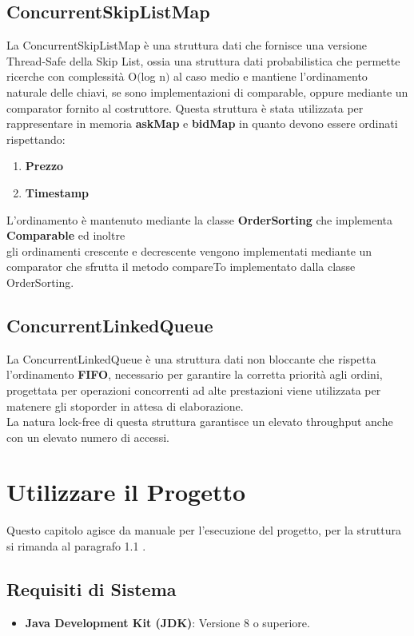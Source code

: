 \documentclass{article}
\begin{document}
\subsection{ConcurrentSkipListMap}
La ConcurrentSkipListMap è una struttura dati che fornisce una versione Thread-Safe della Skip List, ossia 
una struttura dati probabilistica che permette ricerche con complessità O$($log n$)$ al caso medio 
e mantiene l'ordinamento naturale delle chiavi, se sono implementazioni di comparable, oppure mediante un comparator fornito al costruttore.
Questa struttura è stata utilizzata per rappresentare in memoria \textbf{askMap} e \textbf{bidMap} in quanto devono essere ordinati rispettando:
\begin{enumerate}
  \item \textbf{Prezzo}
  \item \textbf{Timestamp}
\end{enumerate} 
L'ordinamento è mantenuto mediante la classe \textbf{OrderSorting} che implementa \textbf{Comparable} ed inoltre 
\\gli ordinamenti crescente e decrescente vengono implementati mediante un comparator che sfrutta il metodo compareTo implementato dalla classe OrderSorting.

\subsection{ConcurrentLinkedQueue}
La ConcurrentLinkedQueue è una struttura dati non bloccante che rispetta l'ordinamento \textbf{FIFO}, necessario per garantire la corretta priorità agli ordini, progettata per operazioni concorrenti ad alte prestazioni viene utilizzata per matenere gli stoporder in attesa di elaborazione. 
\\La natura lock-free di questa struttura garantisce un elevato throughput anche con un elevato numero di accessi.

\newpage

\section{Utilizzare il Progetto}
Questo capitolo agisce da manuale per l'esecuzione del progetto, per la struttura si rimanda al paragrafo 1.1 .
\subsection{Requisiti di Sistema}

\begin{itemize}
  \item \textbf{Java Development Kit (JDK)}: Versione 8 o superiore.
\end{itemize}
\end{document}
